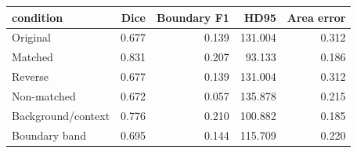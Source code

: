 \begin{tabular}{lrrrr}
\toprule
condition & Dice & Boundary F1 & HD95 & Area error \\
\midrule
Original & 0.677 & 0.139 & 131.004 & 0.312 \\
Matched & 0.831 & 0.207 & 93.133 & 0.186 \\
Reverse & 0.677 & 0.139 & 131.004 & 0.312 \\
Non-matched & 0.672 & 0.057 & 135.878 & 0.215 \\
Background/context & 0.776 & 0.210 & 100.882 & 0.185 \\
Boundary band & 0.695 & 0.144 & 115.709 & 0.220 \\
\bottomrule
\end{tabular}

